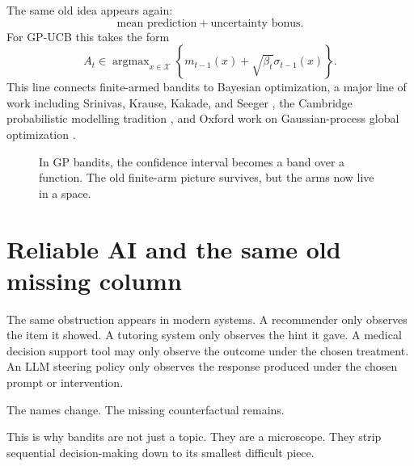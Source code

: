 \documentclass[en,nofont,11pt]{elegantbook}
\newcommand{\calX}{\mathcal{X}}
\providecommand{\argmax}{\mathop{\mathrm{argmax}}}
\begin{document}
The same old idea appears again:
\[
\text{mean prediction} + \text{uncertainty bonus}.
\]
For GP-UCB this takes the form
\[
A_t\in\argmax_{x\in\calX}\left\{m_{t-1}(x)+\sqrt{\beta_t}\sigma_{t-1}(x)\right\}.
\]
This line connects finite-armed bandits to Bayesian optimization, a major line of work including Srinivas, Krause, Kakade, and Seeger \cite{srinivas2010gpucb}, the Cambridge probabilistic modelling tradition \cite{ghahramani2015probabilistic}, and Oxford work on Gaussian-process global optimization \cite{osborne2009gp}.

\begin{figure}[h]
\centering
{}
\caption{In GP bandits, the confidence interval becomes a band over a function. The old finite-arm picture survives, but the arms now live in a space.}
\end{figure}

\section{Reliable AI and the same old missing column}

The same obstruction appears in modern systems. A recommender only observes the item it showed. A tutoring system only observes the hint it gave. A medical decision support tool may only observe the outcome under the chosen treatment. An LLM steering policy only observes the response produced under the chosen prompt or intervention.

The names change. The missing counterfactual remains.

This is why bandits are not just a topic. They are a microscope. They strip sequential decision-making down to its smallest difficult piece.
\end{document}
